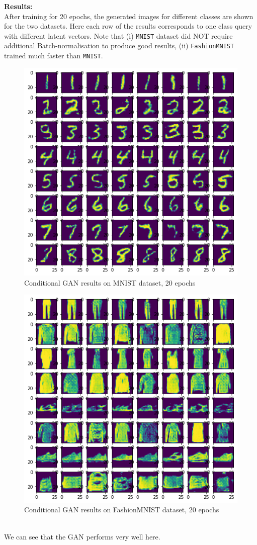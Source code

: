 \documentclass[conference]{IEEEtran}
\begin{document}
\textbf{Results:}\\
After training for 20 epochs, the generated images for different classes are shown for the two datasets. Here each row of the results corresponds to one class query with different latent vectors. Note that (i) \texttt{MNIST} dataset did NOT require additional Batch-normalisation to produce good results, (ii) \texttt{FashionMNIST} trained much faster than \texttt{MNIST}.
\begin{figure}[h]
\centering
\includegraphics[scale = 0.5]{condGAN_MNIST_20epoc.png}
  \caption{Conditional GAN results on MNIST dataset, 20 epochs}
\end{figure}
 \begin{figure}[h]
\centering
\includegraphics[scale = 0.5]{condGAN_Fashion_20epoc.png}
  \caption{Conditional GAN results on FashionMNIST dataset, 20 epochs}
\end{figure}\\
We can see that the GAN performs very well here.
\newpage 
\end{document}

